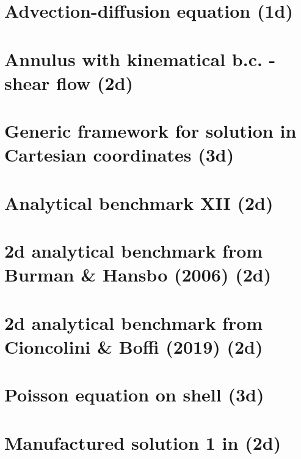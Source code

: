 \section{Advection-diffusion equation (1d)\label{ss:advdiff} }


\section{Annulus with kinematical b.c. - shear flow (2d)}\label{ss:sfan}


\section{Generic framework for solution in Cartesian coordinates (3d)}\label{ss:mms3Dgen}


\section{Analytical benchmark XII (2d)}\label{ss:sofo87_2D}


\section{2d analytical benchmark from Burman \& Hansbo (2006) (2d)}\label{ss:mms_buha06}


\section{2d analytical benchmark from Cioncolini \& Boffi (2019) (2d)\label{ss:mms_cibo19}}


\section{Poisson equation on shell (3d)}
 

\section{Manufactured solution 1 in \textcite{jolm17} (2d) \label{ss:mms_jolm17a}}

